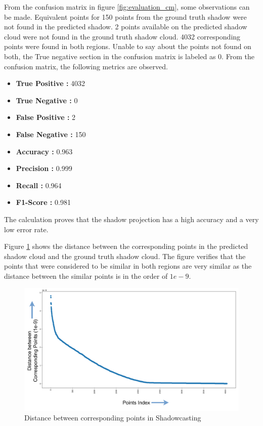 From the confusion matrix in figure \ref{fig:evaluation_cm}, some observations can be made. Equivalent points for 150 points from the ground truth shadow were not found in the predicted shadow. 2 points available on the predicted shadow cloud were not found in the ground truth shadow cloud. 4032 corresponding points were found in both regions. Unable to say about the points not found on both, the True negative section in the confusion matrix is labeled as 0. From the confusion matrix, the following metrics are observed. 
\begin{itemize}
    \item \textbf{True Positive : }4032
    \item \textbf{True Negative : }0
    \item \textbf{False Positive : }2
    \item \textbf{False Negative : }150
    \item \textbf{Accuracy : }0.963
    \item \textbf{Precision : }0.999
    \item \textbf{Recall : }0.964
    \item \textbf{F1-Score : }0.981
\end{itemize}
The calculation proves that the shadow projection has a high accuracy and a very low error rate. 

Figure \ref{fig:evaluation-distn_betn_corresponding_points_in_shadowcasting} shows the distance between the corresponding points in the predicted shadow cloud and the ground truth shadow cloud. The figure verifies that the points that were considered to be similar in both regions are very similar as the distance between the similar points is in the order of \(1e-9\).

\begin{figure}[htbp]
    \centering
    \includegraphics[width=1\linewidth]{97_graphics//evaluation/distn_betn_corresponding_points_in_shadowcasting.pdf}
    \caption{Distance between corresponding points in Shadowcasting}
    \label{fig:evaluation-distn_betn_corresponding_points_in_shadowcasting}
\end{figure}

